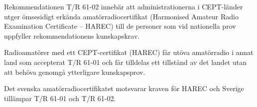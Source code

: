 Rekommendationen T/R 61-02 \cite{TR6102} innebär att administrationerna i
CEPT-länder utger ömsesidigt erkända amatörradiocertifikat (Harmonised Amateur
Radio Examination Certificate -- HAREC) till de personer som vid nationella
prov uppfyller rekommendationens kunskapskrav.

Radioamatörer med ett CEPT-certifikat (HAREC) får utöva amatörradio i annat
land som accepterat T/R 61-01 och får tilldelas ett tillstånd av det landet
utan att behöva genomgå ytterligare kunskapsprov.

Det svenska amatörradiocertifikatet motsvarar kraven för HAREC och Sverige
tillämpar T/R 61-01 och T/R 61-02.
